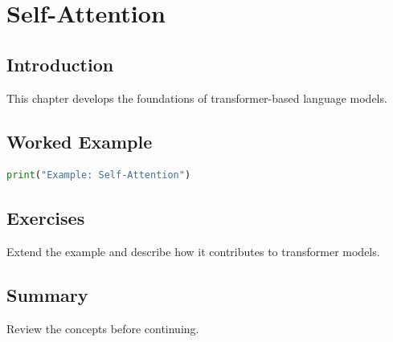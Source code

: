 \chapter{Self-Attention}
\label{chap:vol8-12}
\section{Introduction}
This chapter develops the foundations of transformer-based language models.

\section{Worked Example}
\begin{lstlisting}[language=Python]
print("Example: Self-Attention")
\end{lstlisting}

\section{Exercises}
\begin{exercise}
Extend the example and describe how it contributes to transformer models.
\end{exercise}

\section{Summary}
Review the concepts before continuing.
